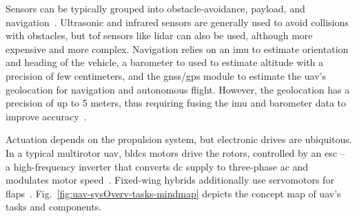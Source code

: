 Sensors can be typically grouped into obstacle-avoidance, payload, and
navigation~\cite{VogeltanzFreeSWUAVSurvey2016}. Ultrasonic and infrared sensors are generally used to avoid
collisions with obstacles, but \gls{tof} sensors like \gls{lidar} can also be
used, although more expensive and more complex.
Navigation relies on an \gls{imu} to estimate orientation and heading of the
vehicle, a barometer to used to estimate altitude with a precision of few
centimeters, and the \gls{gnss}/\gls{gps} module to estimate the
\gls{uav}'s geolocation for navigation and autonomous flight.
However, the geolocation has a precision of up to 5 meters, thus requiring
fusing the \gls{imu} and barometer data to improve accuracy~\cite{ebeidUAVPlatformsSurvey2017}.

Actuation depends on the propulsion system, but electronic drives are
ubiquitous. In a typical multirotor \gls{uav}, \glspl{bldc} motors drive the
rotors, controlled by an \gls{esc} -- a high-frequency inverter that converts
\gls{dc} supply to three-phase \gls{ac} and modulates motor speed~\cite{malyshev_research_2024}.
Fixed-wing hybrids additionally use servomotors for flaps~\cite{gabrielBLDCFixedWingUAV2011}.
%
Fig.~\ref{fig:uav-sysOverv-tasks-mindmap} depicts the concept map of \gls{uav}'s
tasks and components.
%

